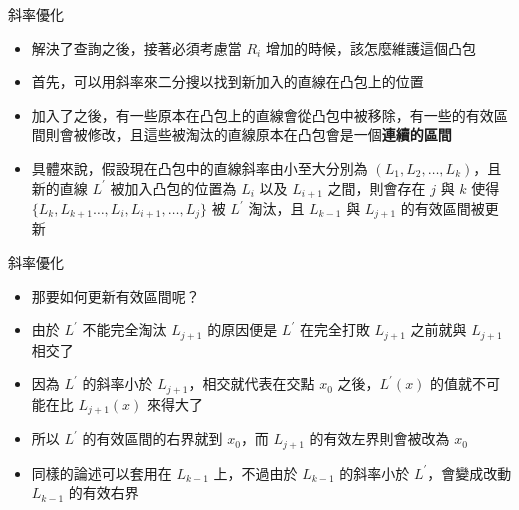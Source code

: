 \documentclass[standalone]{beamer}
\begin{document}
\begin{frame}{斜率優化}
  \begin{itemize}
    \item 解決了查詢之後，接著必須考慮當 $R_i$ 增加的時候，該怎麼維護這個凸包
    \item 首先，可以用斜率來二分搜以找到新加入的直線在凸包上的位置
    \item 加入了之後，有一些原本在凸包上的直線會從凸包中被移除，有一些的有效區間則會被修改，且這些被淘汰的直線原本在凸包會是一個\textbf{連續的區間}
    \item 具體來說，假設現在凸包中的直線斜率由小至大分別為 $(L_1, L_2, \ldots, L_k)$，且新的直線 $L^\prime$ 被加入凸包的位置為 $L_{i}$ 以及 $L_{i + 1}$ 之間，則會存在 $j$ 與 $k$ 使得 $\{L_k, L_{k + 1} \ldots, L_{i}, L_{i + 1}, \ldots, L_{j} \}$ 被 $L^\prime$ 淘汰，且 $L_{k - 1}$ 與 $L_{j + 1}$ 的有效區間被更新
  \end{itemize}
\end{frame}

\begin{frame}{斜率優化}
  \begin{itemize}
    \item 那要如何更新有效區間呢？
    \item 由於 $L^\prime$ 不能完全淘汰 $L_{j + 1}$ 的原因便是 $L^\prime$ 在完全打敗 $L_{j + 1}$ 之前就與 $L_{j + 1}$ 相交了
    \item 因為 $L^\prime$ 的斜率小於 $L_{j + 1}$，相交就代表在交點 $x_0$ 之後，$L^\prime(x)$ 的值就不可能在比 $L_{j + 1}(x)$ 來得大了
    \item 所以 $L^\prime$ 的有效區間的右界就到 $x_0$，而 $L_{j + 1}$ 的有效左界則會被改為 $x_0$
    \item 同樣的論述可以套用在 $L_{k - 1}$ 上，不過由於 $L_{k - 1}$ 的斜率小於 $L^\prime$，會變成改動 $L_{k - 1}$ 的有效右界
  \end{itemize}
\end{frame}
\end{document}
